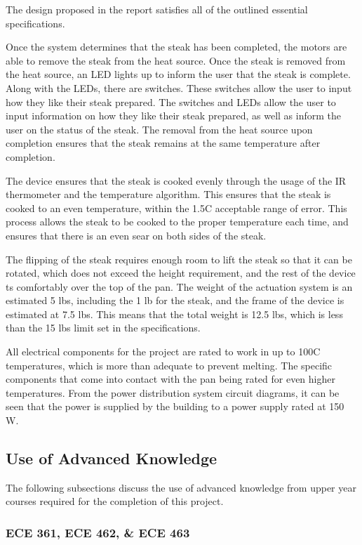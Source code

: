 \documentclass[11pt]{article}
\begin{document}
The design proposed in the report satisfies all of the outlined essential specifications.

Once the system determines that the steak has been completed, the motors are able to remove the steak from the heat source.
Once the steak is removed from the heat source, an LED lights up to inform the user that the steak is complete. Along with the LEDs, there are switches.
These switches allow the user to input how they like their steak prepared.
The switches and LEDs allow the user to input information on how they like their steak prepared, as well as inform the user on the status of the steak.
The removal from the heat source upon completion ensures that the steak remains at the same temperature after completion.

The device ensures that the steak is cooked evenly through the usage of the IR thermometer and the temperature algorithm.
This ensures that the steak is cooked to an even temperature, within the 1.5C acceptable range of error.
This process allows the steak to be cooked to the proper temperature each time, and ensures that there is an even sear on both sides of the steak.

The flipping of the steak requires enough room to lift the steak so that it can be rotated, which does not exceed the height requirement, and the rest of the device ts comfortably over the top of the pan.
The weight of the actuation system is an estimated 5 lbs, including the 1 lb for the steak, and the frame of the device is estimated at 7.5 lbs.
This means that the total weight is 12.5 lbs, which is less than the 15 lbs limit set in the specifications.

All electrical components for the project are rated to work in up to 100C temperatures, which is more than adequate to prevent melting.
The specific components that come into contact with the pan being rated for even higher temperatures.
From the power distribution system circuit diagrams, it can be seen that the power is supplied by the building to a power supply rated at 150 W.

\subsection{Use of Advanced Knowledge}

The following subsections discuss the use of advanced knowledge from upper year courses required for the completion of this project.

\subsubsection{ECE 361, ECE 462, \& ECE 463}
\end{document}
